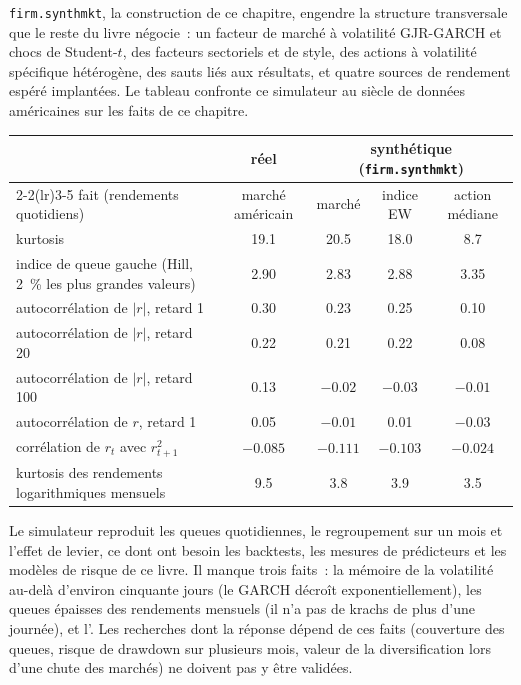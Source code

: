 \texttt{firm.synthmkt}, la construction de ce chapitre, engendre la structure transversale que le reste du livre négocie~: un facteur de marché à
volatilité GJR-GARCH et chocs de Student-$t$, des facteurs sectoriels et de style, des actions à volatilité spécifique hétérogène, des sauts liés aux
résultats, et quatre sources de rendement espéré implantées. Le tableau confronte ce simulateur au siècle de données américaines sur les faits de ce chapitre.

\begin{center}
\small
\begin{tabular}{@{}p{5.4cm}cccc@{}}
\toprule
& réel & \multicolumn{3}{c}{synthétique (\texttt{firm.synthmkt})} \\
\cmidrule(lr){2-2}\cmidrule(lr){3-5}
fait (rendements quotidiens) & marché américain & marché & indice EW & action médiane \\
\midrule
kurtosis & 19.1 & 20.5 & 18.0 & 8.7 \\
indice de queue gauche (Hill, 2~\% les plus grandes valeurs) & 2.90 & 2.83 & 2.88 & 3.35 \\
autocorrélation de $|r|$, retard 1 & 0.30 & 0.23 & 0.25 & 0.10 \\
autocorrélation de $|r|$, retard 20 & 0.22 & 0.21 & 0.22 & 0.08 \\
autocorrélation de $|r|$, retard 100 & 0.13 & $-0.02$ & $-0.03$ & $-0.01$ \\
autocorrélation de $r$, retard 1 & 0.05 & $-0.01$ & 0.01 & $-0.03$ \\
corrélation de $r_t$ avec $r^2_{t+1}$ & $-0.085$ & $-0.111$ & $-0.103$ & $-0.024$ \\
kurtosis des rendements logarithmiques mensuels & 9.5 & 3.8 & 3.9 & 3.5 \\
\bottomrule
\end{tabular}
\end{center}

\begin{remark}\label{rem:rs:stylised-facts-of-returns:scorecard}
Le simulateur reproduit les queues quotidiennes, le regroupement sur un mois et l'effet de levier, ce dont ont besoin les backtests,
les mesures de prédicteurs et les modèles de risque de ce livre. Il manque trois faits~: la mémoire de la volatilité au-delà d'environ cinquante jours (le GARCH
décroît exponentiellement), les queues épaisses des rendements mensuels (il n'a pas de krachs de plus d'une journée), et l'. Les recherches
dont la réponse dépend de ces faits (couverture des queues, risque de drawdown sur plusieurs mois, valeur de la diversification lors d'une chute des marchés) ne doivent pas
y être validées.
\end{remark}

